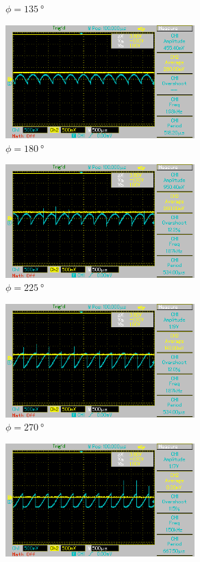 \begin{figure}
\begin{subfigure}{0.5\textwidth}
    \caption{$\phi = \qty[]{135}{\degree}$}%
    \end{subfigure}%
    \hfill
    \begin{subfigure}{0.5\textwidth}%
    \centering%
    \includegraphics[width = 7.3cm]{./Oszilloskop Bilder/png/5.2/T5.png}%
    \caption{$\phi = \qty[]{180}{\degree}$}%
    \end{subfigure}%
    \hfill
    \begin{subfigure}{0.5\textwidth}%
    \centering%
    \includegraphics[width = 7.3cm]{./Oszilloskop Bilder/png/5.2/T6.png}%
    \caption{$\phi = \qty[]{225}{\degree}$}%
    \end{subfigure}%
    \hfill
    \begin{subfigure}{0.5\textwidth}%
    \centering%
    \includegraphics[width = 7.3cm]{./Oszilloskop Bilder/png/5.2/T7.png}%
    \caption{$\phi = \qty[]{270}{\degree}$}%
    \end{subfigure}%
    \hfill
    \begin{subfigure}{0.5\textwidth}%
    \centering%
    \includegraphics[width = 7.3cm]{./Oszilloskop Bilder/png/5.2/T8.png}%

\end{subfigure}
\end{figure}
